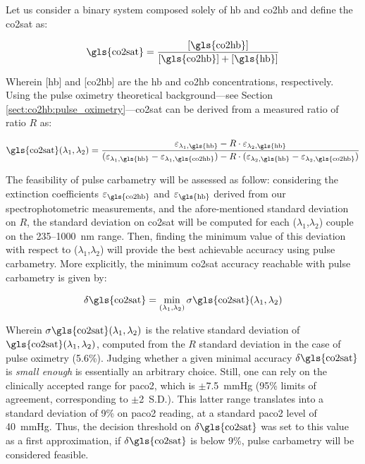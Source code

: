 Let us consider a binary system composed solely of \gls{hb} and \gls{co2hb} and define the \gls{co2sat} as:

\begin{equation}
	\text{\gls{co2sat}} = \frac{ [\text{\gls{co2hb}}] }
	{ [\text{\gls{co2hb}}] + [\text{\gls{hb}}]}
\end{equation}

Wherein [\gls{hb}] and [\gls{co2hb}] are the \gls{hb} and \gls{co2hb} concentrations, respectively. Using the pulse oximetry theoretical background---see Section \ref{sect:co2hb:pulse_oximetry}---\gls{co2sat} can be derived from a measured ratio of ratio $R$ as:

\begin{equation}\label{eq:co2sat_exp}
	\text{\gls{co2sat}}(\lambda_1,\lambda_2) = \frac{\varepsilon_{\lambda_1, \text{\gls{hb}}} - R \cdot \varepsilon_{\lambda_2, \text{\gls{hb}}}}
	{(\varepsilon_{\lambda_1, \text{\gls{hb}}} - \varepsilon_{\lambda_1, \text{\gls{co2hb}}}) - R\cdot (\varepsilon_{\lambda_2, \text{\gls{hb}}} - \varepsilon_{\lambda_2, \text{\gls{co2hb}}} )}
\end{equation}

The feasibility of pulse carbametry will be assessed as follow: considering the extinction coefficients $\varepsilon_{\text{\gls{co2hb}}}$ and $\varepsilon_{\text{\gls{hb}}}$ derived from our spectrophotometric measurements, and the afore-mentioned standard deviation on $R$, the standard deviation on \gls{co2sat} will be computed for each ($\lambda_1$,$\lambda_2$) couple on the 235--1000~nm range. Then, finding the minimum value of this deviation with respect to ($\lambda_1$,$\lambda_2$) will provide the best achievable accuracy using pulse carbametry. More explicitly, the minimum \gls{co2sat} accuracy reachable with pulse carbametry is given by:

\begin{equation}\label{eq:co2sat_err}
	\delta\text{\gls{co2sat}} = \min_{(\lambda_1,\lambda_2)} \sigma\text{\gls{co2sat}}(\lambda_1,\lambda_2)
\end{equation}

Wherein $\sigma\text{\gls{co2sat}}(\lambda_1,\lambda_2)$ is the relative standard deviation of $\text{\gls{co2sat}}(\lambda_1,\lambda_2)$, computed from the $R$ standard deviation in the case of pulse oximetry (5.6\%). Judging whether a given minimal accuracy $\delta\text{\gls{co2sat}}$ is \emph{small enough} is essentially an arbitrary choice. Still, one can rely on the clinically accepted range for \gls{paco2}, which is $\pm$7.5~mmHg (95\% limits of agreement, corresponding to $\pm$2~S.D.)\cite{bendjelid2005}. This latter range translates into a standard deviation of 9\% on \gls{paco2} reading, at a standard \gls{paco2} level of 40~mmHg. Thus, the decision threshold on $\delta\text{\gls{co2sat}}$ was set to this value as a first approximation, \ie{} if $\delta\text{\gls{co2sat}}$ is below 9\%, pulse carbametry will be considered feasible.

